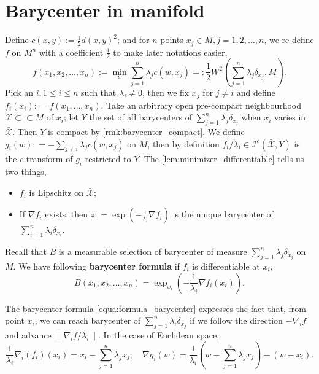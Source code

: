 \section{Barycenter in manifold}

\label{section:barycenter_manifold}
Define $c(x, y):=\frac{1}{2} d(x, y)^2$;
and for $n$ points $x_j \in M, j=1,2,\ldots,n$, we re-define $f$ on $M^n$ with a coefficient $\frac{1}{2}$
to make later notations easier,
\[
	f(x_1, x_2, \ldots, x_n) := \min_{w} \sum_{j=1}^n \lambda_j c(w, x_j) =: \frac{1}{2}W^2(\sum_{j=1}^n \lambda_j \delta_{x_j}, M).
\]
Pick an $i, 1 \leq i \leq n$ such that $\lambda_i \neq 0$, then we fix $x_j$ for $j \neq i$ and
define $f_i (x_i) : = f(x_1, \ldots, x_n)$.
Take an arbitrary open pre-compact neighbourhood $\mathcal{X} \subset \subset M$ of $x_i$;
let $Y$ the set of all barycenters of $\sum_{j=1}^n \lambda_j \delta_{x_j}$
when $x_i$ varies in $\bar{ \mathcal{X} }$.
Then $Y$ is compact by \cref{rmk:barycenter_compact}.
We define $g_i(w): = -\sum_{j \neq i} \lambda_j c(w, x_j)$ on $M$,
then by definition $f_i /\lambda_i \in \mathcal{I}^c (\bar{ \mathcal{X}}, Y)$
is the $c$-transform of
$g_i$ restricted to $Y$.
The \cref{lem:minimizer_differentiable} tells us two things,
\begin{itemize}
	\item $f_i$ is Lipschitz on $\bar{ \mathcal{X} }$;
	\item If $ \nabla f_i $ exists, then $z: = \exp( - \frac{1}{\lambda_i}\nabla f_i)$ is the
	      unique barycenter of $\sum_{i=1}^n \lambda_i \delta_{x_i}$.
\end{itemize}
Recall that $B$ is a measurable selection of barycenter of
measure $\sum_{j=1}^{n} \lambda_j \delta_{x_j}$ on $M$.
We have following \textbf{barycenter formula}
if $f_i$ is differentiable at $x_i$,
\begin{equation}
	\label{equa:formula_barycenter}
	B(x_1, x_2, \ldots, x_n) = \exp_{x_i} (- \frac{1}{\lambda_i} \nabla f_i(x_i)).
\end{equation}

The barycenter formula \cref{equa:formula_barycenter} expresses the fact that,
from point $x_i$,
we can reach barycenter of $\sum_{j=1}^n \lambda_i \delta_{x_j}$ if we follow the direction $-\nabla_i f$
and advance $\| \nabla_i f / \lambda_i \| $.
In the case of Euclidean space,
\[
	\frac{1}{\lambda_i} \nabla_i (f_i)(x_i) = x_i - \sum_{j=1}^n \lambda_j x_j;                              \quad
	\nabla g_i(w)  = \frac{1}{\lambda_i} (w - \sum_{j=1}^n \lambda_j x_j) -(w-x_i).
\]

